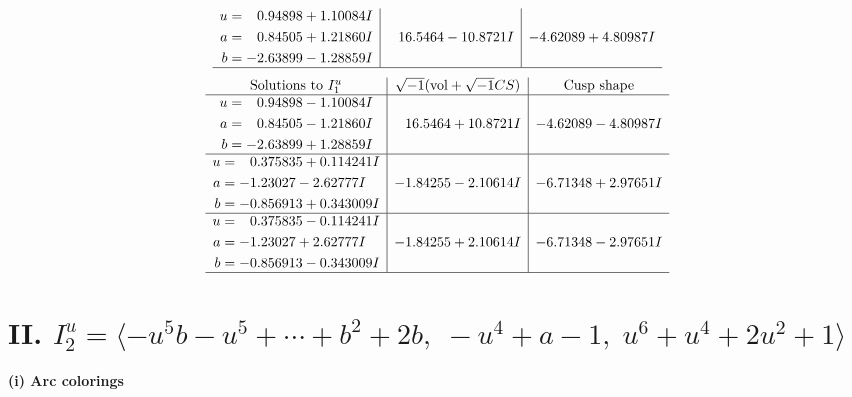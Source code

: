 \documentclass[1p]{elsarticle_modified}
\theoremstyle{definition}
\newcommand{\I}{\sqrt{-1}}
\begin{document}
$$\begin{array}{c|c|c}
\begin{aligned}
u &= \phantom{-}0.94898 + 1.10084 I \\
a &= \phantom{-}0.84505 + 1.21860 I \\
b &= -2.63899 - 1.28859 I\end{aligned}
 & \phantom{-}16.5464 - 10.8721 I & -4.62089 + 4.80987 I\\
 \hline 
 \end{array}$$\newpage$$\begin{array}{c|c|c}  
\text{Solutions to }I^u_{1}& \I (\text{vol} + \sqrt{-1}CS) & \text{Cusp shape}\\
 \hline 
\begin{aligned}
u &= \phantom{-}0.94898 - 1.10084 I \\
a &= \phantom{-}0.84505 - 1.21860 I \\
b &= -2.63899 + 1.28859 I\end{aligned}
 & \phantom{-}16.5464 + 10.8721 I & -4.62089 - 4.80987 I \\ \hline\begin{aligned}
u &= \phantom{-}0.375835 + 0.114241 I \\
a &= -1.23027 - 2.62777 I \\
b &= -0.856913 + 0.343009 I\end{aligned}
 & -1.84255 - 2.10614 I & -6.71348 + 2.97651 I \\ \hline\begin{aligned}
u &= \phantom{-}0.375835 - 0.114241 I \\
a &= -1.23027 + 2.62777 I \\
b &= -0.856913 - 0.343009 I\end{aligned}
 & -1.84255 + 2.10614 I & -6.71348 - 2.97651 I\\
 \hline 
 \end{array}$$\newpage\newpage\renewcommand{\arraystretch}{1}
\centering \section*{II. $I^u_{2}= \langle - u^5 b- u^5+\cdots+b^2+2 b,\;- u^4+a-1,\;u^6+u^4+2 u^2+1 \rangle$}
\flushleft \textbf{(i) Arc colorings}\\
\end{document}
